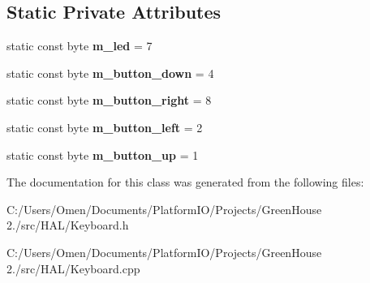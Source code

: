 \subsection*{Static Private Attributes}
\begin{DoxyCompactItemize}
\item 
\mbox{\label{class_h_a_l_1_1_keyboard_a24fef44e24311d359a15e5759b1fe622}} 
static const byte {\bfseries m\+\_\+led} = 7
\item 
\mbox{\label{class_h_a_l_1_1_keyboard_ae9cb5bf48f8a2fb111d66591362feeeb}} 
static const byte {\bfseries m\+\_\+button\+\_\+down} = 4
\item 
\mbox{\label{class_h_a_l_1_1_keyboard_a2d9c2ab4e44b3703cdd5de43cf53447c}} 
static const byte {\bfseries m\+\_\+button\+\_\+right} = 8
\item 
\mbox{\label{class_h_a_l_1_1_keyboard_acd08c3e7430b9b82187a5b16d490d618}} 
static const byte {\bfseries m\+\_\+button\+\_\+left} = 2
\item 
\mbox{\label{class_h_a_l_1_1_keyboard_ac4677f66593aa0b4a7780518f7d09d55}} 
static const byte {\bfseries m\+\_\+button\+\_\+up} = 1
\end{DoxyCompactItemize}


The documentation for this class was generated from the following files\+:\begin{DoxyCompactItemize}
\item 
C\+:/\+Users/\+Omen/\+Documents/\+Platform\+I\+O/\+Projects/\+Green\+House 2./src/\+H\+A\+L/Keyboard.\+h\item 
C\+:/\+Users/\+Omen/\+Documents/\+Platform\+I\+O/\+Projects/\+Green\+House 2./src/\+H\+A\+L/Keyboard.\+cpp\end{DoxyCompactItemize}
